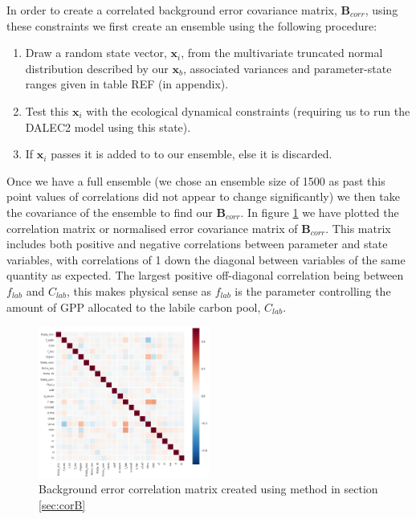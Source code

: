 \documentclass[11pt]{article}
\begin{document}
In order to create a correlated background error covariance matrix, $\textbf{B}_{corr}$, using these constraints we first create an ensemble using the following procedure:
\begin{enumerate}
\item Draw a random state vector, $\textbf{x}_i$, from the multivariate truncated normal distribution described by our $\textbf{x}_b$, associated variances and parameter-state ranges given in table REF (in appendix).
\item Test this $\textbf{x}_i$ with the ecological dynamical constraints (requiring us to run the DALEC2 model using this state).
\item If $\textbf{x}_i$ passes it is added to to our ensemble, else it is discarded.
\end{enumerate}
Once we have a full ensemble (we chose an ensemble size of 1500 as past this point values of correlations did not appear to change significantly) we then take the covariance of the ensemble to find our $\textbf{B}_{corr}$. In figure \ref{fig:Bcorr} we have plotted the correlation matrix or normalised error covariance matrix of $\textbf{B}_{corr}$. This matrix includes both positive and negative correlations between parameter and state variables, with correlations of 1 down the diagonal between variables of the same quantity as expected. The largest positive off-diagonal correlation being between $f_{lab}$ and $C_{lab}$, this makes physical sense as $f_{lab}$ is the parameter controlling the amount of GPP allocated to the labile carbon pool, $C_{lab}$.

\begin{figure}[ht]
    \centering
    \includegraphics[width=0.5\textwidth]{b_edcNone_corrmat.png}
    \caption{Background error correlation matrix created using method in section \ref{sec:corB}}
    \label{fig:Bcorr}
\end{figure}
\end{document}
